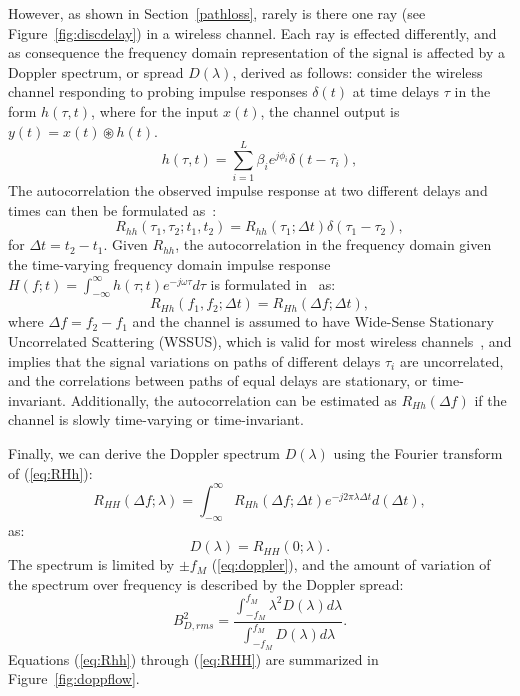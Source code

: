 However, as shown in Section~\ref{pathloss}, rarely is there one ray (see Figure~\ref{fig:discdelay}) in a wireless channel. Each ray is effected differently, and as consequence the frequency domain representation of the signal is affected by a Doppler spectrum, or spread $D(\lambda)$, derived as follows: consider the wireless channel responding to probing impulse responses $\delta(t)$ at time delays $\tau$ in the form $h(\tau, t)$, where for the input $x(t)$, the channel output is $y(t) = x(t) \circledast h(t)$.
\begin{equation}
\label{eq:multipathimpulse}
h(\tau, t) = \sum_{i=1}^L \beta_i e^{j\phi_i} \delta(t-\tau_i),
\end{equation}
The autocorrelation the observed impulse response at two different delays and times can then be formulated as~\cite{pahlavan2005wireless}:
\begin{equation}
\label{eq:Rhh}
R_{hh}(\tau_1,\tau_2;t_1,t_2) = R_{hh}(\tau_1;\Delta t) \delta(\tau_1-\tau_2),
\end{equation}
for $\Delta t = t_2-t_1$. Given $R_{hh}$, the autocorrelation in the frequency domain given the time-varying frequency domain impulse response $H(f;t)=\int_{-\infty}^{\infty} h(\tau;t) e^{-j\omega \tau}d\tau$ is formulated in~\cite{pahlavan2005wireless} as:
\begin{equation}
\label{eq:RHh}
R_{Hh}(f_1,f_2; \Delta t) = R_{Hh}(\Delta f; \Delta t),
\end{equation}
where $\Delta f = f_2-f_1$ and the channel is assumed to have Wide-Sense Stationary Uncorrelated Scattering (WSSUS), which is valid for most wireless channels~\cite{pahlavan2005wireless}, and implies that the signal variations on paths of different delays $\tau_i$ are uncorrelated, and the correlations between paths of equal delays are stationary, or time-invariant. Additionally, the autocorrelation can be estimated as $R_{Hh}(\Delta f)$ if the channel is slowly time-varying or time-invariant.

Finally, we can derive the Doppler spectrum $D(\lambda)$ using the Fourier transform of (\ref{eq:RHh}):
\begin{equation}
\label{eq:RHH}
R_{HH}(\Delta f; \lambda) = \int_{-\infty}^{\infty} R_{Hh}(\Delta f; \Delta t) e^{-j2\pi \lambda \Delta t}d(\Delta t),
\end{equation}
as:
\begin{equation}
\label{eq:doppspect}
D(\lambda) = R_{HH}(0;\lambda).
\end{equation}
The spectrum is limited by $\pm f_M$ (\ref{eq:doppler}), and the amount of variation of the spectrum over frequency is described by the Doppler spread:
\begin{equation}
\label{eq:doppspread}
B_{D,rms}^2 = \frac{\int_{-f_M}^{f_M} \lambda^2 D(\lambda) d\lambda}{\int_{-f_M}^{f_M} D(\lambda) d\lambda}.
\end{equation}
Equations (\ref{eq:Rhh}) through (\ref{eq:RHH}) are summarized in Figure~\ref{fig:doppflow}.

